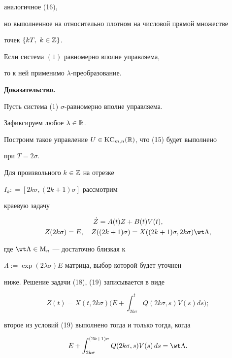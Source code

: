 аналогичное (16),


но выполненное на относительно плотном на числовой прямой множестве


точек $\{kT,\ k\in\Bbb Z\}$.





\begin{thmnonum} Если система $(1)$ равномерно вполне управляема,


то к ней применимо $\lambda$-пре\-об\-ра\-зование.


\end{thmnonum}





{\bf Доказательство.}


Пусть система (1) $\sigma$-равномерно вполне управляема.


Зафиксируем любое $\lambda\in\Bbb R$.


Построим такое управление $U\in\operatorname{KC}_{m,n}(\Bbb R)$, что (15) будет выполнено


при $T=2\sigma$.


Для произвольного $k\in\Bbb Z$ на отрезке


$I_k: =[2k\sigma,(2k+1)\sigma]$ рассмотрим


краевую задачу


\begin{gather}


\Dot Z=A(t)Z+B(t)V(t),\\


Z(2k\sigma)=E,\quad Z((2k+1)\sigma)=X((2k+1)\sigma,2k\sigma)\wt\Lambda,


\end{gather}


где $\wt\Lambda\in\M_{n}$ --- достаточно близкая к


$\Lambda:=\exp(2\lambda\sigma)E$ матрица, выбор которой будет уточнен


ниже. Решение задачи (18), (19) записывается в виде


\begin{equation}


Z(t)=X(t,2k\sigma)\bigg(E+\int_{2k\sigma}^{t}Q(2k\sigma,s)V(s)ds\bigg);


\end{equation}


второе из условий (19) выполнено тогда и только тогда, когда


\begin{equation}


E+\int_{2k\sigma}^{(2k+1)\sigma}Q(2k\sigma,s)V(s)\,ds=\wt\Lambda.


\end{equation}





